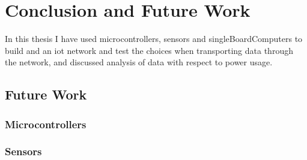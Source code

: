 \chapter{Conclusion and Future Work}
\label{chp:results}



In this thesis I have used \glspl{microcontroller}, sensors and \glspl{singleBoardComputer} to build and an \gls{iot} network and test the choices when transporting data through the network, and discussed analysis of data with respect to power usage. 

\section{Future Work}

\subsection{Microcontrollers}

\subsection{Sensors}

